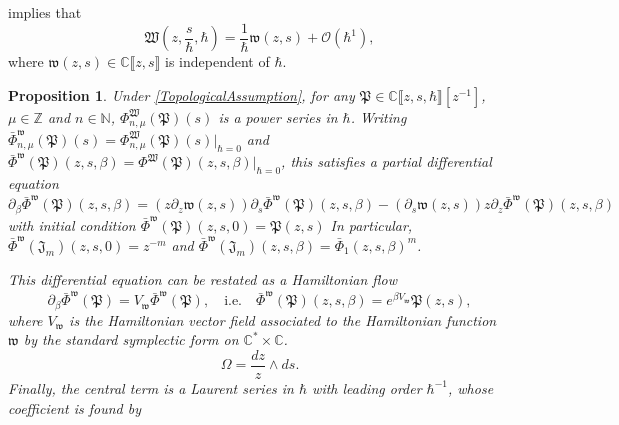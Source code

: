 \documentclass[10pt,a4paper,oneside,no-math,reqno]{amsart}%
\theoremstyle{plain}
\newtheorem{proposition}[theorem]{Proposition}
\theoremstyle{definition}
\theoremstyle{remark}
\numberwithin{equation}{section}
\newcommand{\mb}[1]{\mathbb{#1}}
\newcommand{\mf}[1]{\mathfrak{#1}}
\newcommand{\mc}[1]{\mathcal{#1}}
\newcommand{\1}{\mathds{1}}
\newcommand{\N}{\mb{N}}
\newcommand{\C}{\mb{C}}
\newcommand{\Z}{\mb{Z}}
\newcommand{\<}{\langle}
\renewcommand{\>}{\rangle}
\newcommand{\del}{\partial}
\DeclareMathOperator*{\Res}{Res}
\begin{document}
 implies that
\begin{equation}\label{LeadingOrderAssumption}
	\mf{W}(z, \frac{s}{\hbar}, \hbar) = \frac{1}{\hbar} \mf{w}(z,s) + \mc{O}(\hbar^1),
\end{equation}
where $ \mf{w} (z, s) \in \C \llbracket z, s\rrbracket$ is independent of $ \hbar$.

\begin{proposition}
    Under \cref{TopologicalAssumption}, for any $ \mf{P} \in \C \llbracket z, s, \hbar \rrbracket [ z^{-1} ]$, $\mu \in \Z$ and $ n \in \N$, $ \Phi^{\mf{W}}_{n,\mu} (\mf{P})(s)$ is a power series in $ \hbar$.
	Writing $ \bar{\Phi}^{\mf{w}}_{n,\mu} (\mf{P})(s) = \Phi^{\mf{W}}_{n,\mu} (\mf{P})(s) \big|_{\hbar = 0}$ and $\bar{\Phi}^{\mf{w}}(\mf{P}) (z,s,\beta) = \Phi^{\mf{W}}(\mf{P}) (z,s,\beta) \big|_{\hbar = 0}$, this satisfies a partial differential equation
	\begin{equation}\label{PDE}
		\del_\beta \bar{\Phi}^{\mf{w}}(\mf{P}) (z,s,\beta)
		=
		(z\del_z \mf{w}(z,s)) \del_s \bar{\Phi}^{\mf{w}}(\mf{P}) (z,s,\beta) - (\del_s \mf{w}(z,s)) z \del_z \bar{\Phi}^{\mf{w}}(\mf{P}) (z,s,\beta)
	\end{equation}
	with initial condition $ \bar{\Phi}^{\mf{w}}(\mf{P}) (z,s,0) = \mf{P}(z,s)$ In particular, $ \bar{\Phi}^{\mf{w}} (\mf{J}_m) (z,s,0) = z^{-m}$ and $ \bar{\Phi}^{\mf{w}}(\mf{J}_m) (z,s,\beta ) = \bar{\Phi}_1 (z, s, \beta)^m $.\par
	This differential equation can be restated as a Hamiltonian flow
	\begin{equation}\label{HamFlow}
		\del_\beta \bar{\Phi}^{\mf{w}} (\mf{P})
        = 
        V_\mf{w} \bar{\Phi}^{\mf{w}} (\mf{P}) ,
        \quad
        \text{i.e.}
        \quad
        \bar{\Phi}^{\mf{w}} (\mf{P}) (z, s, \beta )
        =
        e^{\beta V_{\mf{w}}} \mf{P} (z,s),
	\end{equation}
	where $ V_\mf{w}$ is the Hamiltonian vector field associated to the Hamiltonian function $ \mf{w}$ by the standard symplectic form on $ \C^* \times \C$.
	\begin{equation}\label{SymplecticForm}
		\Omega 
		= 
		\frac{dz}{z} \wedge ds .
	\end{equation}
    Finally, the central term is a Laurent series in $ \hbar$ with leading order $ \hbar^{-1}$, whose coefficient is found by
    \begin{equation}\label{CentralTermAsFunctions}

\end{equation}
\end{proposition}
\end{document}
